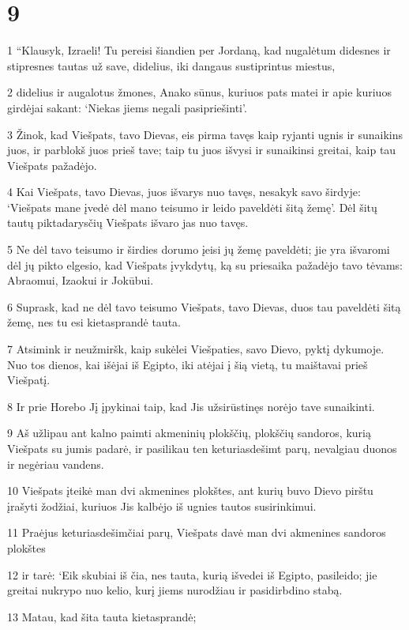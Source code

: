 \chapter{9}


\par 1 “Klausyk, Izraeli! Tu pereisi šiandien per Jordaną, kad nugalėtum didesnes ir stipresnes tautas už save, didelius, iki dangaus sustiprintus miestus, 
\par 2 didelius ir augalotus žmones, Anako sūnus, kuriuos pats matei ir apie kuriuos girdėjai sakant: ‘Niekas jiems negali pasipriešinti’. 
\par 3 Žinok, kad Viešpats, tavo Dievas, eis pirma tavęs kaip ryjanti ugnis ir sunaikins juos, ir parblokš juos prieš tave; taip tu juos išvysi ir sunaikinsi greitai, kaip tau Viešpats pažadėjo. 
\par 4 Kai Viešpats, tavo Dievas, juos išvarys nuo tavęs, nesakyk savo širdyje: ‘Viešpats mane įvedė dėl mano teisumo ir leido paveldėti šitą žemę’. Dėl šitų tautų piktadarysčių Viešpats išvaro jas nuo tavęs. 
\par 5 Ne dėl tavo teisumo ir širdies dorumo įeisi jų žemę paveldėti; jie yra išvaromi dėl jų pikto elgesio, kad Viešpats įvykdytų, ką su priesaika pažadėjo tavo tėvams: Abraomui, Izaokui ir Jokūbui. 
\par 6 Suprask, kad ne dėl tavo teisumo Viešpats, tavo Dievas, duos tau paveldėti šitą žemę, nes tu esi kietasprandė tauta. 
\par 7 Atsimink ir neužmiršk, kaip sukėlei Viešpaties, savo Dievo, pyktį dykumoje. Nuo tos dienos, kai išėjai iš Egipto, iki atėjai į šią vietą, tu maištavai prieš Viešpatį. 
\par 8 Ir prie Horebo Jį įpykinai taip, kad Jis užsirūstinęs norėjo tave sunaikinti. 
\par 9 Aš užlipau ant kalno paimti akmeninių plokščių, plokščių sandoros, kurią Viešpats su jumis padarė, ir pasilikau ten keturiasdešimt parų, nevalgiau duonos ir negėriau vandens. 
\par 10 Viešpats įteikė man dvi akmenines plokštes, ant kurių buvo Dievo pirštu įrašyti žodžiai, kuriuos Jis kalbėjo iš ugnies tautos susirinkimui. 
\par 11 Praėjus keturiasdešimčiai parų, Viešpats davė man dvi akmenines sandoros plokštes 
\par 12 ir tarė: ‘Eik skubiai iš čia, nes tauta, kurią išvedei iš Egipto, pasileido; jie greitai nukrypo nuo kelio, kurį jiems nurodžiau ir pasidirbdino stabą. 
\par 13 Matau, kad šita tauta kietasprandė; 
